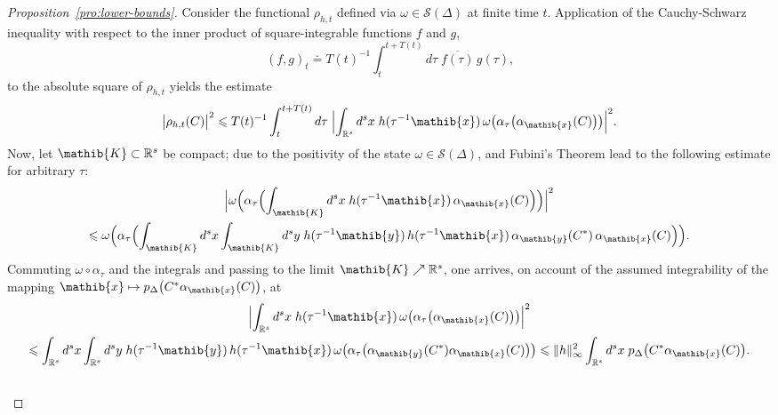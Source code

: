 \documentclass[a4paper,a4paper]{article}
\numberwithin{equation}{section}
\newcommand{\Kib}{\mathib{K}}
\newcommand{\xib}{\mathib{x}}
\newcommand{\yib}{\mathib{y}}
\newcommand{\Sscr}{\mathscr{S}}
\newcommand{\Rs}{\mathbb{R}^s}
\newcommand{\aibx}{\alpha_\mathib{x}}
\newcommand{\aiby}{\alpha_\mathib{y}}
\theoremstyle{definition}
\theoremstyle{plain}
\theoremstyle{remark}
\newcommand{\babs}[1]{\bigl\lvert #1 \bigr\rvert}
\newcommand{\Babs}[1]{\Bigl\lvert #1 \Bigr\rvert}
\newcommand{\norm}[1]{\lVert #1 \rVert}
\newcommand{\bpDx}[1]{p_\Delta \bigl( #1 \bigr)}
\begin{document}
  \begin{proof}[Proposition~\ref{pro:lower-bounds}]
    Consider the functional $\rho_{h , t}$ defined via $\omega \in
    \Sscr ( \Delta )$ at finite time $t$. Application of the
    Cauchy-Schwarz inequality with respect to the inner product of
    square-integrable functions $f$ and $g$,
    \begin{equation*}
      ( f , g )_t \doteq T ( t )^{-1} \int_t^{t + T ( t )} d \tau \;
      \overline{f ( \tau )} \, g ( \tau ) \text{,}
    \end{equation*}
    to the absolute square of $\rho_{h , t}$ yields the estimate
    \begin{equation}
      \label{eq:csi-estimate}
      \babs{\rho_{h , t} ( C )}^2 \leqslant T ( t )^{-1} \int_t^{t + T
      ( t )} d \tau \; \Babs{\int_{\Rs} d^s x \; h ( \tau^{-1} \xib )
      \, \omega \bigl( \alpha_\tau \bigl( \aibx ( C ) \bigr) \bigr)}^2
      \text{.}
    \end{equation}
    Now, let $\Kib \subset \Rs$ be compact; due to the positivity of
    the state $\omega \in \Sscr ( \Delta )$,
    \cite[Proposition~2.3.11(b)]{bratteli/robinson:1987} and Fubini's
    Theorem \cite[II.16.3]{fell/doran:1988a} lead to the following
    estimate for arbitrary $\tau$:
    \begin{multline}
      \Babs{\omega \Bigl( \alpha_\tau \Bigl( \int_\Kib d^s x \; h (
      \tau^{-1} \xib ) \, \aibx ( C ) \Bigr) \Bigr)}^2 \\
      \leqslant \omega \Bigl( \alpha_\tau \Bigl( \int_\Kib d^s x
      \int_\Kib d^s y \; h ( \tau^{-1} \yib ) \, h ( \tau^{-1} \xib )
      \, \aiby ( C^* ) \, \aibx ( C ) \Bigr) \Bigr) \text{.}
    \end{multline}
    Commuting $\omega \circ \alpha_\tau$ and the
    integrals and passing to the limit $\Kib \nearrow \Rs$, one
    arrives, on account of the assumed integrability of the mapping $\xib
    \mapsto \bpDx{C^* \aibx ( C )}$, at
    \begin{multline}
      \label{eq:pos-omega-estimate}
      \Babs{\int_{\Rs} d^s x \; h ( \tau^{-1} \xib ) \, \omega \bigl(
      \alpha_\tau \bigl( \aibx ( C ) \bigr) \bigr)}^2 \\
      \leqslant \int_{\Rs} d^s x \int_{\Rs} d^s y \; h ( \tau^{-1}
      \yib ) \, h ( \tau^{-1} \xib ) \, \omega \bigl( \alpha_\tau
      \bigl( \aiby ( C^* ) \aibx ( C ) \bigr) \bigr) \leqslant
      \norm{h}_\infty^2 \int_{\Rs} d^s x \; \bpDx{C^* \aibx ( C )}
      \text{.} \\
      ~

\end{multline}
\end{proof}
\end{document}
